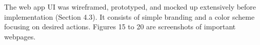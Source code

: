 \documentclass{article}
\begin{document}
The web app UI was wireframed, prototyped, and mocked up extensively before implementation (Section 4.3). It consists of simple branding and a color scheme focusing on desired actions. Figures 15 to 20 are screenshots of important webpages.

\begin{figure}[h]
\end{figure}
\end{document}
